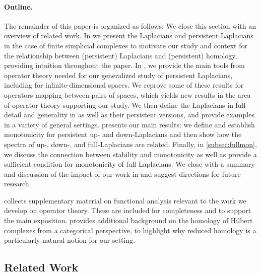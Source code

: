 \documentclass[11pt]{article}
\theoremstyle{definition}
\theoremstyle{remark}
\begin{document}
\paragraph{Outline.} The remainder of this paper is organized as follows: We close this section with an overview of related work. In  we present the Laplacians and persistent Laplacians in the case of finite simplicial complexes to motivate our study and context for the relationship between (persistent) Laplacians and (persistent) homology, providing intuition throughout the paper. In , we provide the main tools from operator theory needed for our generalized study of persistent Laplacians, including for infinite-dimensional spaces. We reprove some of these results for operators mapping between pairs of spaces, which yields new results in the area of operator theory supporting our study. We then define the Laplacians in full detail and generality in  as well as their persistent versions, and provide examples in a variety of general settings.  presents our main results: we define and establish monotonicity for persistent up- and down-Laplacians and then show how the spectra of up-, down-, and full-Laplacians are related. Finally, in \cref{subsec:fullmon}, we discuss the connection between stability and monotonicity as well as provide a sufficient condition for monotonicity of full Laplacians. We close with a summary and discussion of the impact of our work in  and suggest directions for future research.

 collects supplementary material on functional analysis relevant to the work we develop on operator theory. These are included for completeness and to support the main exposition.   provides additional background on the homology of Hilbert complexes from a categorical perspective, to highlight why reduced homology is a particularly natural notion for our setting.

\subsection{Related Work} \label{subsection:relwork}
\end{document}
